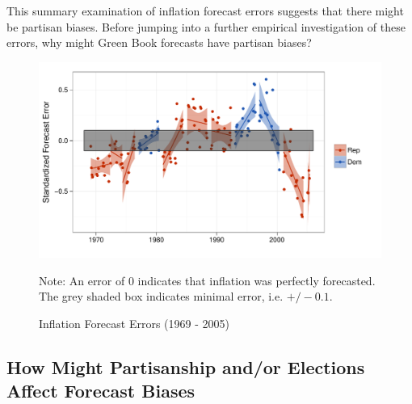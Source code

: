 \documentclass[a4paper]{article}\usepackage{graphicx, color}
\newenvironment{knitrout}{}{} %
\begin{document}
This summary examination of inflation forecast errors suggests that there might be partisan biases. Before jumping into a further empirical investigation of these errors, why might Green Book forecasts have partisan biases?

\begin{figure}[t]
    \caption{Inflation Forecast Errors (1969 - 2005)}
    \label{errors_over_time}
    \begin{center}
    
\begin{knitrout}
\color{fgcolor}\includegraphics[width=0.8\linewidth]{figure/PartisanError} 
\end{knitrout}

    
    \end{center}
    \begin{singlespace}
        {\scriptsize{Note: An error of 0 indicates that inflation was perfectly forecasted. \\
            The grey shaded box indicates minimal error, i.e. $+/- 0.1$.
        }}
    \end{singlespace}
\end{figure}


\subsection{How Might Partisanship and/or Elections Affect Forecast Biases}




\end{document}
